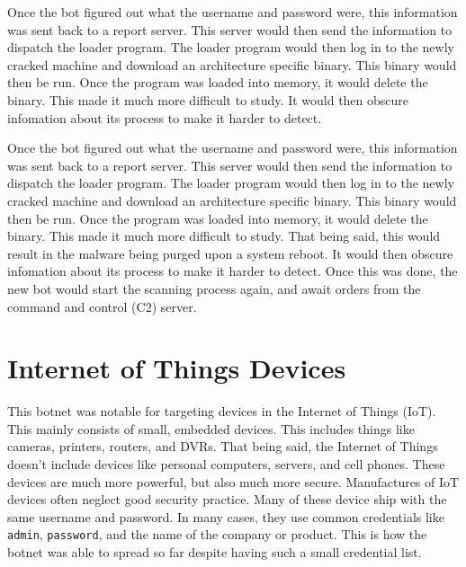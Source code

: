 \documentclass[conference]{IEEEtran}
\begin{document}
Once the bot figured out what the username and password were, this information was sent back to a report server. This server would then send the information to dispatch the loader program. The loader program would then log in to the newly cracked machine and download an architecture specific binary. This binary would then be run. Once the program was loaded into memory, it would delete the binary. This made it much more difficult to study. It would then obscure infomation about its process to make it harder to detect. 

Once the bot figured out what the username and password were, this information was sent back to a report server. This server would then send the information to dispatch the loader program. The loader program would then log in to the newly cracked machine and download an architecture specific binary. This binary would then be run. Once the program was loaded into memory, it would delete the binary. This made it much more difficult to study. That being said, this would result in the malware being purged upon a system reboot. It would then obscure infomation about its process to make it harder to detect.  Once this was done, the new bot would start the scanning process again, and await orders from the command and control (C2) server.

\section{Internet of Things Devices}

This botnet was notable for targeting devices in the Internet of Things (IoT). This mainly consists of small, embedded devices. This includes things like cameras, printers, routers, and DVRs. That being said, the Internet of Things doesn't include devices like personal computers, servers, and cell phones. These devices are much more powerful, but also much more secure. Manufactures of IoT devices often neglect good security practice. Many of these device ship with the same username and password. In many cases, they use common credentials like \verb|admin|, \verb|password|, and the name of the company or product. This is how the botnet was able to spread so far despite having such a small credential list.



\end{document}
